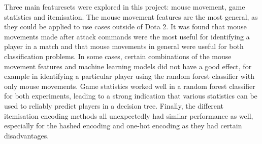 \documentclass[Report.tex]{subfiles}
\begin{document}
Three main featuresets were explored in this project: mouse movement, game statistics and itemisation. The mouse movement features are the most general, as they could be applied to use cases outside of Dota 2. It was found that mouse movements made after attack commands were the most useful for identifying a player in a match and that mouse movements in general were useful for both classification problems. In some cases, certain combinations of the mouse movement features and machine learning models did not have a good effect, for example in identifying a particular player using the random forest classifier with only mouse movements. Game statistics worked well in a random forest classifier for both experiments, leading to a strong indication that various statistics can be used to reliably predict players in a decision tree. Finally, the different itemisation encoding methods all unexpectedly had similar performance as well, especially for the hashed encoding and one-hot encoding as they had certain disadvantages.
\end{document}
